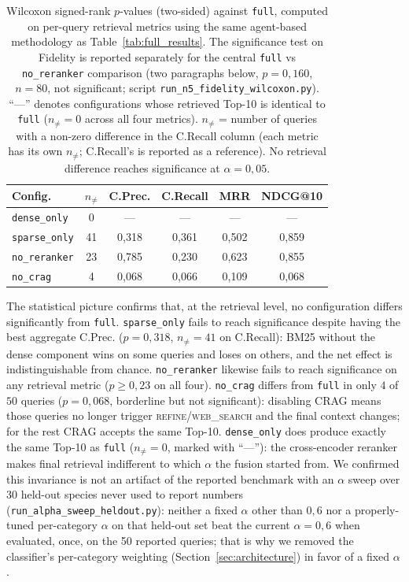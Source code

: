 \documentclass[runningheads]{llncs}
\begin{document}
\begin{table}[!ht]
\centering
\caption{Wilcoxon signed-rank $p$-values (two-sided) against \texttt{full}, computed on per-query retrieval metrics using the same agent-based methodology as Table~\ref{tab:full_results}. The significance test on Fidelity is reported separately for the central \texttt{full} vs \texttt{no\_reranker} comparison (two paragraphs below, $p{=}0{,}160$, $n{=}80$, not significant; script \texttt{run\_n5\_fidelity\_wilcoxon.py}). ``---'' denotes configurations whose retrieved Top-10 is identical to \texttt{full} ($n_{\neq}{=}0$ across all four metrics). $n_{\neq}$ = number of queries with a non-zero difference in the C.Recall column (each metric has its own $n_{\neq}$; C.Recall's is reported as a reference). No retrieval difference reaches significance at $\alpha{=}0{,}05$.}
\label{tab:wilcoxon}
\footnotesize
\begin{tabular}{l c c c c c}
\toprule
\textbf{Config.} & \textbf{$n_{\neq}$} & \textbf{C.Prec.} & \textbf{C.Recall} & \textbf{MRR} & \textbf{NDCG@10} \\
\midrule
\texttt{dense\_only}    &  0 & --- & --- & --- & --- \\
\texttt{sparse\_only}   & 41 & 0{,}318 & 0{,}361 & 0{,}502 & 0{,}859 \\
\texttt{no\_reranker}   & 23 & 0{,}785 & 0{,}230 & 0{,}623 & 0{,}855 \\
\texttt{no\_crag}       &  4 & 0{,}068 & 0{,}066 & 0{,}109 & 0{,}068 \\
\bottomrule
\end{tabular}
\end{table}

The statistical picture confirms that, at the retrieval level, no configuration differs significantly from \texttt{full}. \texttt{sparse\_only} fails to reach significance despite having the best aggregate C.Prec. ($p{=}0{,}318$, $n_{\neq}{=}41$ on C.Recall): BM25 without the dense component wins on some queries and loses on others, and the net effect is indistinguishable from chance. \texttt{no\_reranker} likewise fails to reach significance on any retrieval metric ($p{\geq}0{,}23$ on all four). \texttt{no\_crag} differs from \texttt{full} in only $4$ of $50$ queries ($p{=}0{,}068$, borderline but not significant): disabling CRAG means those queries no longer trigger \textsc{refine}/\textsc{web\_search} and the final context changes; for the rest CRAG accepts the same Top-10. \texttt{dense\_only} does produce exactly the same Top-10 as \texttt{full} ($n_{\neq}{=}0$, marked with ``---''): the cross-encoder reranker makes final retrieval indifferent to which $\alpha$ the fusion started from. We confirmed this invariance is not an artifact of the reported benchmark with an $\alpha$ sweep over 30 held-out species never used to report numbers (\texttt{run\_alpha\_sweep\_heldout.py}): neither a fixed $\alpha$ other than $0{,}6$ nor a properly-tuned per-category $\alpha$ on that held-out set beat the current $\alpha{=}0{,}6$ when evaluated, once, on the 50 reported queries; that is why we removed the classifier's per-category weighting (Section~\ref{sec:architecture}) in favor of a fixed $\alpha$.
\end{document}
